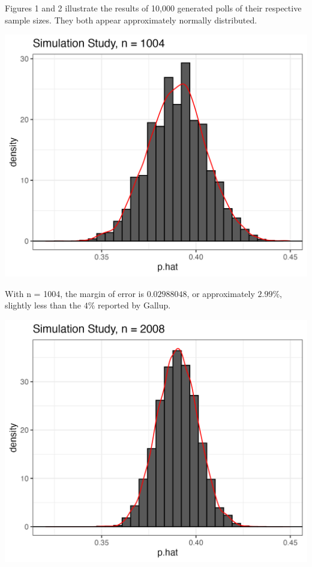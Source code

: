 \documentclass{article}\usepackage[]{graphicx}\usepackage[]{xcolor}
\newenvironment{Figure}
  {\par\medskip\noindent\minipage{\linewidth}}
  {\endminipage\par\medskip}
\begin{document}
\begin{multicols}{2}
Figures 1 and 2 illustrate the results of 10,000 generated polls of their respective sample sizes. They both appear approximately normally distributed.

\begin{Figure}
\begin{center}
  \includegraphics[width=\textwidth]{task1_1.png}
\end{center} 
\end{Figure}

With n = 1004, the margin of error is $0.02988048$, or approximately $2.99\%$, slightly less than the $4\%$ reported by Gallup.

\begin{Figure}
\begin{center}
  \includegraphics[width=\textwidth]{task1_2.png}
\end{center} 
\end{Figure}


\end{multicols}
\end{document}
